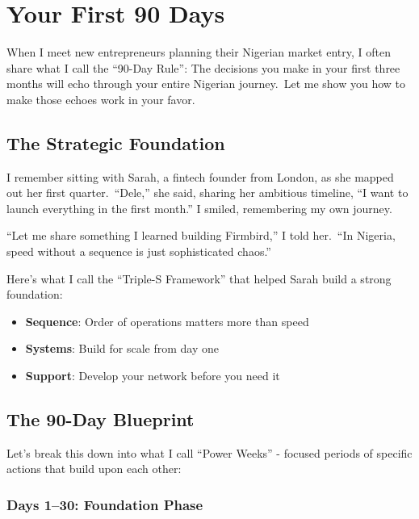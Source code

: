 \chapter{Your First 90 Days}\label{ch:first-90-days}

\begin{importantbox}
When I meet new entrepreneurs planning their Nigerian market entry, I often share what I call the ``90-Day Rule'': The decisions you make in your first three months will echo through your entire Nigerian journey.\ Let me show you how to make those echoes work in your favor.
\end{importantbox}

\section{The Strategic Foundation}\label{sec:strategic-foundation}

I remember sitting with Sarah, a fintech founder from London, as she mapped out her first quarter.\ ``Dele,'' she said, sharing her ambitious timeline, ``I want to launch everything in the first month.'' I smiled, remembering my own journey.

``Let me share something I learned building Firmbird,'' I told her.\ ``In Nigeria, speed without a sequence is just sophisticated chaos.''

Here's what I call the ``Triple-S Framework'' that helped Sarah build a strong foundation:

\begin{itemize}
    \item \textbf{Sequence}: Order of operations matters more than speed
    \item \textbf{Systems}: Build for scale from day one
    \item \textbf{Support}: Develop your network before you need it
\end{itemize}

\section{The 90-Day Blueprint}\label{sec:90-day-blueprint}

Let's break this down into what I call ``Power Weeks'' - focused periods of specific actions that build upon each other:

\subsection{Days 1--30: Foundation Phase}\label{subsec:foundation-phase}

